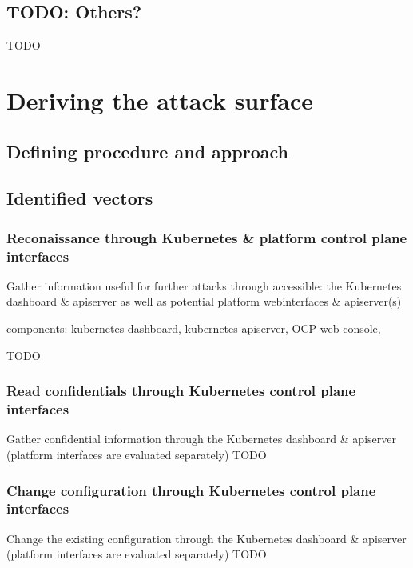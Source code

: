 \section{TODO: Others?}
TODO

\chapter{Deriving the attack surface}

\section{Defining procedure and approach}



\section{Identified vectors}

\subsection{Reconaissance through Kubernetes \& platform control plane interfaces}
Gather information useful for further attacks through accessible: the Kubernetes dashboard \& apiserver as well as potential platform webinterfaces & apiserver(s)

components: kubernetes dashboard, kubernetes apiserver, OCP web console, 

TODO

\subsection{Read confidentials through Kubernetes control plane interfaces}
Gather confidential information through the Kubernetes dashboard & apiserver (platform interfaces are evaluated separately)
TODO

\subsection{Change configuration through Kubernetes control plane interfaces}
Change the existing configuration through the Kubernetes dashboard & apiserver (platform interfaces are evaluated separately)
TODO

